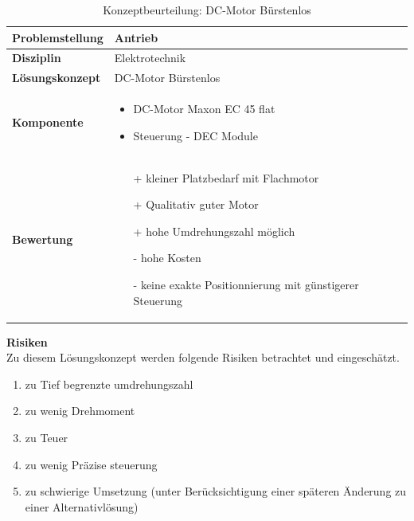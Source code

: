 \documentclass[../../main.tex]{subfiles}
\begin{document}
    \begin{flushleft}
        \begin{table}[H]
        \begin{tabular}{ | l | p{11cm} |}
        \hline
        \textbf{Problemstellung} & Antrieb \\ \hline
        \textbf{Disziplin} & Elektrotechnik \\ \hline
        \textbf{Lösungskonzept} & DC-Motor Bürstenlos\\ \hline
        \textbf{Komponente} & \begin{itemize}
            \item DC-Motor Maxon EC 45 flat
            \item Steuerung - DEC Module
            \end{itemize}\\ \hline
        \textbf{Bewertung} &  \begin{itemize}
                                \item[+] kleiner Platzbedarf mit Flachmotor
                                \item[+] Qualitativ guter Motor
                                \item[+] hohe Umdrehungszahl möglich 
                                \item[-] hohe Kosten 
                                \item[-] keine exakte Positionnierung mit günstigerer Steuerung
                              \end{itemize} \\ \hline
        \end{tabular}
        \caption{Konzeptbeurteilung: DC-Motor Bürstenlos}
        \label{tab:antr_konzept_dcMotor_buerstenlos}
    \end{table}
    \end{flushleft}

    \textbf{Risiken}\\
    Zu diesem Lösungskonzept werden folgende Risiken betrachtet und eingeschätzt.
    \begin{enumerate}[I]
        \item zu Tief begrenzte umdrehungszahl
        \item zu wenig Drehmoment
        \item zu Teuer
        \item zu wenig Präzise steuerung
        \item zu schwierige Umsetzung (unter Berücksichtigung einer späteren Änderung zu einer Alternativlösung)        
    \end{enumerate}
\end{document}
